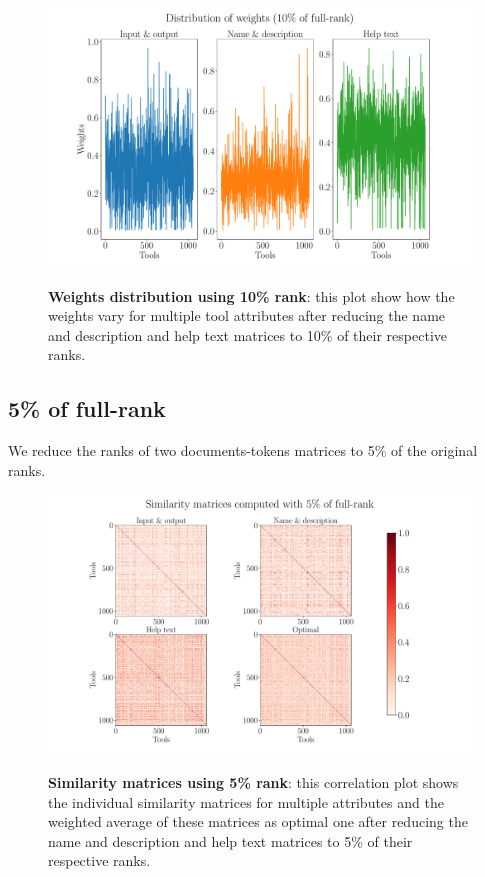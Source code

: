 \begin{figure}[h]
\begin{centering}
    {\includegraphics[scale=0.35]{figures/Weights_010.pdf}}
    \caption[Weights distribution 10\% rank]{\textbf{Weights distribution using 10\% rank}: this plot show how the weights vary for multiple tool attributes after reducing the name and description and help text matrices to 10\% of their respective ranks.}
\end{centering}
\end{figure}


\subsection{5\% of full-rank}
We reduce the ranks of two documents-tokens matrices to 5\% of the original ranks.

\begin{figure}[h]
\begin{centering}
    {\includegraphics[scale=0.35]{figures/Similarity_matrices_005.pdf}}
    \caption[Similarity matrices 5\% rank]{\textbf{Similarity matrices using 5\% rank}: this correlation plot shows the individual similarity matrices for multiple attributes and the weighted average of these matrices as optimal one after reducing the name and description and help text matrices to 5\% of their respective ranks.}
\end{centering}
\end{figure}

